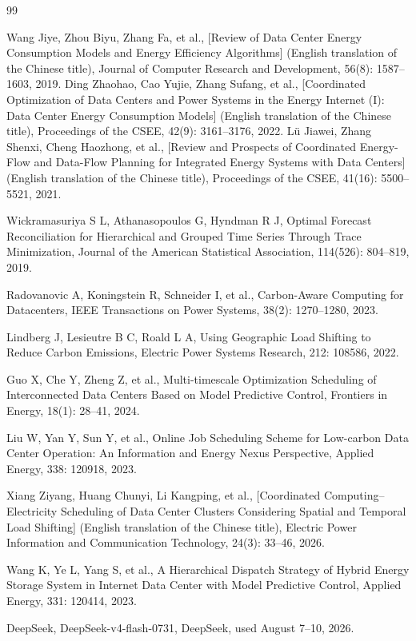 \begin{thebibliography}{99}
	\RaggedRight
	
	\setlength{\itemsep}{0pt}
	\setlength{\parskip}{0pt}
	\setlength{\parsep}{0pt}
	
	\linespread{1.5}\selectfont
	
	\setlength{\emergencystretch}{2em}
	
    Wang Jiye, Zhou Biyu, Zhang Fa, et al., [Review of Data Center Energy Consumption Models and Energy Efficiency Algorithms] (English translation of the Chinese title),
    Journal of Computer Research and Development, 56(8): 1587--1603, 2019.
    Ding Zhaohao, Cao Yujie, Zhang Sufang, et al., [Coordinated Optimization of Data Centers and Power Systems in the Energy Internet (I): Data Center Energy Consumption Models] (English translation of the Chinese title),
    Proceedings of the CSEE, 42(9): 3161--3176, 2022.
    L\"u Jiawei, Zhang Shenxi, Cheng Haozhong, et al., [Review and Prospects of Coordinated Energy-Flow and Data-Flow Planning for Integrated Energy Systems with Data Centers] (English translation of the Chinese title),
    Proceedings of the CSEE, 41(16): 5500--5521, 2021.
	
	Wickramasuriya S L, Athanasopoulos G, Hyndman R J,
	Optimal Forecast Reconciliation for Hierarchical and Grouped Time Series Through Trace Minimization,
	Journal of the American Statistical Association, 114(526): 804--819, 2019.
	
	Radovanovic A, Koningstein R, Schneider I, et al.,
	Carbon-Aware Computing for Datacenters,
	IEEE Transactions on Power Systems, 38(2): 1270--1280, 2023.
	
	Lindberg J, Lesieutre B C, Roald L A,
	Using Geographic Load Shifting to Reduce Carbon Emissions,
	Electric Power Systems Research, 212: 108586, 2022.
	
	Guo X, Che Y, Zheng Z, et al.,
	Multi-timescale Optimization Scheduling of Interconnected Data Centers Based on Model Predictive Control,
	Frontiers in Energy, 18(1): 28--41, 2024.
	
	Liu W, Yan Y, Sun Y, et al.,
	Online Job Scheduling Scheme for Low-carbon Data Center Operation: An Information and Energy Nexus Perspective,
	Applied Energy, 338: 120918, 2023.
	
    Xiang Ziyang, Huang Chunyi, Li Kangping, et al., [Coordinated Computing--Electricity Scheduling of Data Center Clusters Considering Spatial and Temporal Load Shifting] (English translation of the Chinese title),
    Electric Power Information and Communication Technology, 24(3): 33--46, 2026.
	
	Wang K, Ye L, Yang S, et al.,
	A Hierarchical Dispatch Strategy of Hybrid Energy Storage System in Internet Data Center with Model Predictive Control,
	Applied Energy, 331: 120414, 2023.

    DeepSeek, DeepSeek-v4-flash-0731, DeepSeek, used August 7--10, 2026.
	
\end{thebibliography}

